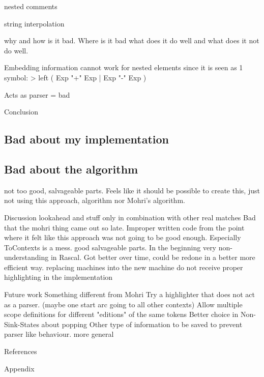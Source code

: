 	nested comments
	
	string interpolation

	why and how is it bad. Where is it bad what does it do well and what does it not do well.
	
	Embedding information cannot work for nested elements since it is seen as 1 symbol:
		> left 	( Exp "+" Exp
				| Exp "-" Exp
				)

	Acts as parser = bad
	


Conclusion
\subsection{Bad about my implementation}

\subsection{Bad about the algorithm}
not too good, salvageable parts. Feels like it should be possible to create this, just not using this approach, algorithm nor Mohri's algorithm.


Discussion
lookahead and stuff only in combination with other real matches
Bad that the mohri thing came out so late. Improper written code from the point where it felt like this approach was not going to be good enough. Especially ToContexts is a mess. good salvageable parts. 
In the beginning very non-understanding in Rascal. Got better over time, could be redone in a better more efficient way.
	replacing machines into the new machine do not receive proper highlighting in the implementation

Future work
	Something different from Mohri
	Try a highlighter that does not act as a parser. (maybe one start arc going to all other contexts)
	Allow multiple scope definitions for different "editions" of the same tokens
	Better choice in Non-Sink-States about popping
	Other type of information to be saved to prevent parser like behaviour. more general

References

Appendix
